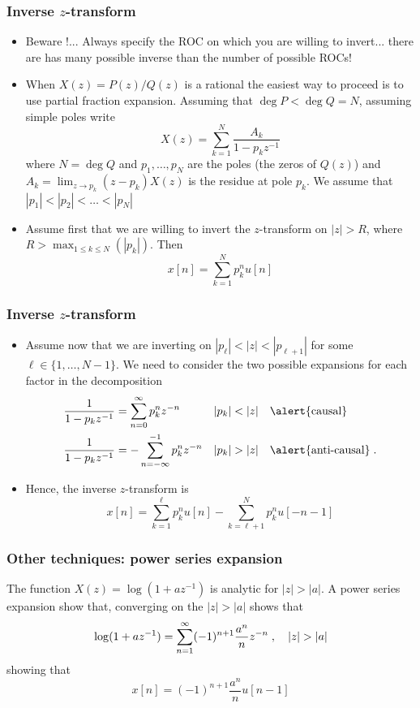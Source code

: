 \begin{frame}
\frametitle{Inverse $z$-transform}
\begin{itemize}
\item Beware !...  Always specify the ROC on which you are willing to invert... there are has many possible inverse than the number of possible ROCs!
\item When $X(z)= P(z)/Q(z)$ is a rational the easiest way to proceed is to use \alert{partial fraction expansion}. Assuming that $\deg P < \deg Q=N$, assuming simple poles write
\[
X(z)= \sum_{k=1}^N \frac{A_k}{1-p_k z^{-1}}
\]
where $N= \deg Q$ and $p_1,\dots,p_N$ are the \alert{poles} (the zeros of $Q(z)$) and $A_k= \lim_{z \to p_k} (z-p_k) X(z)$ is the
\alert{residue} at pole $p_k$. We assume that $|p_1| < |p_2| < \dots <|p_N|$
\item Assume first that we are willing to invert the $z$-transform on $|z| > R$, where $R > \max_{1 \leq k \leq N}( |p_k|)$. Then
\[
x[n] = \sum_{k=1}^N p_k^n u[n]
\]
\end{itemize}
\end{frame}

\begin{frame}
\frametitle{Inverse $z$-transform}
\begin{itemize}
\item Assume now that we are inverting on  $|p_{\ell}| < |z| < |p_{\ell+1}|$ for some $\ell \in \{1, \dots, N-1\}$.
We need to consider the two possible expansions for each factor in the decomposition
\begin{align*}
&\frac{1}{1-p_k z^{-1}} = \sum_{n=0}^\infty p_k^{n} z^{-n} && |p_k| < |z| \quad \text{\alert{causal}} \\
&\frac{1}{1-p_k z^{-1}} = - \sum_{n=-\infty}^{-1} p_k^n z^{-n} && |p_k| > |z| \quad \text{\alert{anti-causal}} \text\eqsp.
\end{align*}
\item Hence, the inverse $z$-transform is
\[
x[n] = \sum_{k=1}^\ell p_k^n u[n] - \sum_{k=\ell+1}^N p_k^n u[-n-1]
\]
\end{itemize}
\end{frame}


\begin{frame}
\frametitle{Other techniques: power series expansion}
The function $X(z)= \log(1 + a z^{-1})$  is analytic for $|z| > |a|$. A power series expansion show that, converging on the $|z| > |a|$ shows that
\[
\log(1 + az ^{-1}) = \sum_{n=1}^\infty (-1)^{n+1} \frac{a^n}{n} z^{-n} \;, \quad |z| > |a|
\]
showing that
\[
x[n]= (-1)^{n+1} \frac{a^n}{n} u[n-1]
\]

\end{frame}

